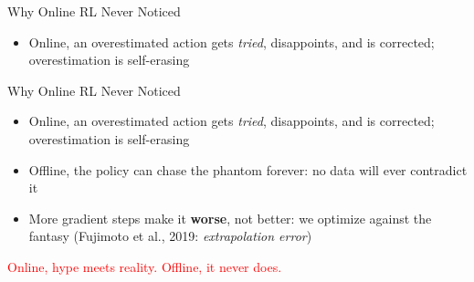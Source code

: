 \begin{frame}{Why Online RL Never Noticed}
\begin{itemize}
    \item Online, an overestimated action gets \emph{tried}, disappoints, and is
          corrected; overestimation is self-erasing
\end{itemize}
\end{frame}

\begin{frame}{Why Online RL Never Noticed}
\begin{itemize}
    \item Online, an overestimated action gets \emph{tried}, disappoints, and is
          corrected; overestimation is self-erasing
    \item Offline, the policy can chase the phantom forever: no data will ever
          contradict it
    \item More gradient steps make it \textbf{worse}, not better: we optimize
          against the fantasy (Fujimoto et al., 2019: \emph{extrapolation error})
\end{itemize}
\vspace{0.8em}
\begin{center}
\textcolor{red}{Online, hype meets reality. Offline, it never does.}
\end{center}
\end{frame}
